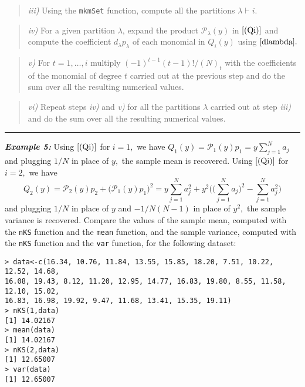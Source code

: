 \begin{quote}
\emph{iii)} Using the \texttt{mkmSet} function, compute all the
partitions \(\lambda \vdash i.\)
\end{quote}

\begin{quote}
\emph{iv)} For a given partition \(\lambda\), expand the product
\({\mathcal P}_{\lambda}(y)\) in \(\eqref{(Qi)}\) and compute the
coefficient \(d_{\lambda} p_{\lambda}\) of each monomial in \(Q_i(y)\)
using \(\eqref{dlambda}.\)
\end{quote}

\begin{quote}
\emph{v)} For \(t=1, \ldots, i\) multiply \((-1)^{t-1} (t-1)!/(N)_t\)
with the coefficients of the monomial of degree \(t\) carried out at the
previous step and do the sum over all the resulting numerical values.
\end{quote}

\begin{quote}
\emph{vi)} Repeat steps \emph{iv)} and \emph{v)} for all the partitions
\(\lambda\) carried out at step \emph{iii)} and do the sum over all the
resulting numerical values.
\end{quote}

\noindent

\rule{13cm}{0.4pt}

\hskip-0.5cm\textbf{\emph{Example 5:}} Using \(\eqref{(Qi)}\) for
\(i=1,\) we have \(Q_1(y) = {\mathcal P}_1(y) p_1 = y \sum_{j=1}^N a_j\)
and plugging \(1/N\) in place of \(y,\) the sample mean is recovered.
Using \(\eqref{(Qi)}\) for \(i=2,\) we have
\[Q_2(y) = {\mathcal P}_2(y) p_2 +  \big({\mathcal P}_1(y) p_1\big)^2 =  y \sum_{j=1}^N a_j^2 + y^2 \bigg( \big(\sum_{j=1}^N a_j\big)^2 - \sum_{j=1}^N a_j^2\bigg)\]
and plugging \(1/N\) in place of \(y\) and \(-1/N(N-1)\) in place of
\(y^2,\) the sample variance is recovered. Compare the values of the
sample mean, computed with the \texttt{nKS} function and the
\texttt{mean} function, and the sample variance, computed with the
\texttt{nKS} function and the \texttt{var} function, for the following
dataset:

\begin{verbatim}
> data<-c(16.34, 10.76, 11.84, 13.55, 15.85, 18.20, 7.51, 10.22, 12.52, 14.68, 
16.08, 19.43, 8.12, 11.20, 12.95, 14.77, 16.83, 19.80, 8.55, 11.58, 12.10, 15.02, 
16.83, 16.98, 19.92, 9.47, 11.68, 13.41, 15.35, 19.11)
> nKS(1,data)
[1] 14.02167
> mean(data)
[1] 14.02167
> nKS(2,data)
[1] 12.65007
> var(data)
[1] 12.65007
\end{verbatim}

